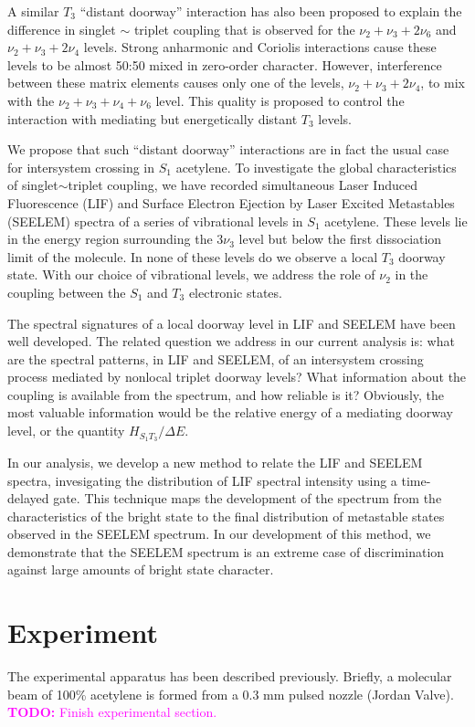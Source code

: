 \documentclass[12pt]{mitthesis}
\newcommand{\TODO}[1]{\textcolor{magenta}{\textbf{TODO:} #1}}
\begin{document}
A similar $T_3$ ``distant doorway'' interaction has also been proposed
to explain the difference in singlet $\sim$ triplet coupling that is
observed for the $\nu_2 + \nu_3 + 2\nu_6$ and $\nu_2 + \nu_3 + 2\nu_4$
levels.  Strong anharmonic and Coriolis interactions cause these
levels to be almost 50:50 mixed in zero-order character.  However,
interference between these matrix elements causes only one of the
levels, $\nu_2 + \nu_3 + 2\nu_4$, to mix with the $\nu_2 + \nu_3 +
\nu_4 + \nu_6$ level.  This quality is proposed to control the
interaction with mediating but energetically distant $T_3$ levels.

We propose that such ``distant doorway'' interactions are in fact the
usual case for intersystem crossing in $S_1$ acetylene.  To
investigate the global characteristics of singlet$\sim$triplet
coupling, we have recorded simultaneous Laser Induced Fluorescence
(LIF) and Surface Electron Ejection by Laser Excited Metastables
(SEELEM) spectra of a series of vibrational levels in $S_1$ acetylene.
These levels lie in the energy region surrounding the $3\nu_3$ level
but below the first dissociation limit of the molecule.  In none of
these levels do we observe a local $T_3$ doorway state.  With our
choice of vibrational levels, we address the role of $\nu_2$ in the
coupling between the $S_1$ and $T_3$ electronic states.

The spectral signatures of a local doorway level in LIF and SEELEM
have been well developed.  The related question we address in our
current analysis is: what are the spectral patterns, in LIF and
SEELEM, of an intersystem crossing process mediated by nonlocal
triplet doorway levels?  What information about the coupling is
available from the spectrum, and how reliable is it?  Obviously, the
most valuable information would be the relative energy of a mediating
doorway level, or the quantity $H_{S_1 T_3}/\Delta E$.

In our analysis, we develop a new method to relate the LIF and SEELEM
spectra, invesigating the distribution of LIF spectral intensity using
a time-delayed gate.  This technique maps the development of the
spectrum from the characteristics of the bright state to the final
distribution of metastable states observed in the SEELEM spectrum.  In
our development of this method, we demonstrate that the SEELEM
spectrum is an extreme case of discrimination against large amounts of
bright state character.

\section{Experiment}

The experimental apparatus has been described previously.  Briefly, a
molecular beam of 100\% acetylene is formed from a 0.3 mm pulsed
nozzle (Jordan Valve). \TODO{Finish experimental section.} 
\end{document}
